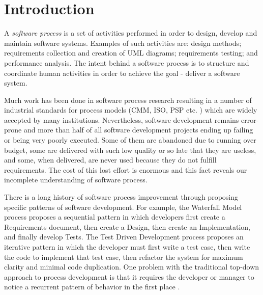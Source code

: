 \chapter{Introduction}
A \textit{software process} is a set of activities performed in order to design, develop and maintain software systems. Examples of such activities are: design methods; requirements collection and creation of UML diagrams; requirements testing; and performance analysis. The intent behind a software process is to structure and coordinate human activities in order to achieve the goal - deliver a software system.

Much work has been done in software process research resulting in a number of industrial standards for process models (CMM, ISO, PSP etc. \cite{citeulike:5043104}) which are widely accepted by many institutions. Nevertheless, software development remains error-prone and more than half of all software development projects ending up failing or being very poorly executed. Some of them are abandoned due to running over budget, some are delivered with such low quality or so late that they are useless, and some, when delivered, are never used because they do not fulfill requirements. The cost of this lost effort is enormous and this fact reveals our incomplete understanding of software process.

There is a long history of software process improvement through proposing specific patterns of software development. For example, the Waterfall Model process proposes a sequential pattern in which developers first create a Requirements document, then create a Design, then create an Implementation, and finally develop Tests. The Test Driven Development process proposes an iterative pattern in which the developer must first write a test case, then write the code to implement that test case, then refactor the system for maximum clarity and minimal code duplication. One problem with the traditional top-down approach to process development is that it requires the developer or manager to notice a recurrent pattern of behavior in the first place \cite{citeulike:5043104}. 

